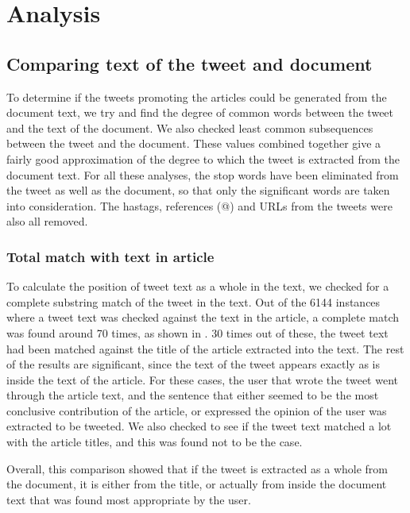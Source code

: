 \section{Analysis}
\subsection{Comparing text of the tweet and document}

To determine if the tweets promoting the articles could be generated from the document text, we try and find the degree of common words between the tweet and the text of the document. We also checked least common subsequences between the tweet and the document. These values combined together give a fairly good approximation of the degree to which the tweet is extracted from the document text. For all these analyses, the stop words have been eliminated from the tweet as well as the document, so that only the significant words are taken into consideration. The hastags, references (@) and URLs from the tweets were also all removed.

\subsubsection {Total match with text in article}

To calculate the position of tweet text as a whole in the text, we checked for a complete substring match of the tweet in the text. Out of the 6144 instances where a tweet text was checked against the text in the article, a complete match was found around 70 times, as shown in . 30 times out of these, the tweet text had been matched against the title of the article extracted into the text. The rest of the results are significant, since the text of the tweet appears exactly as is inside the text of the article. For these cases, the user that wrote the tweet went through the article text, and the sentence that either seemed to be the most conclusive contribution of the article, or expressed the opinion of the user was extracted to be tweeted. We also checked to see if the tweet text matched a lot with the article titles, and this was found not to be the case. 

Overall, this comparison showed that if the tweet is extracted as a whole from the document, it is either from the title, or actually from inside the document text that was found most appropriate by the user. 

